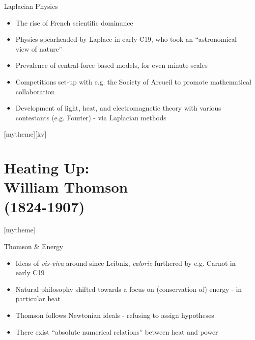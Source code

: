 \documentclass{beamer}
\newcommand{\sectionpic}[2]{
   \setbeamertemplate{section page}[mytheme][#2]
   \section{#1}
   \setbeamertemplate{section page}[mytheme]
}
\begin{document}
\begin{frame}{Laplacian Physics}
\begin{itemize}
	\item The rise of French scientific dominance
	\item Physics spearheaded by Laplace in early C19, who took an ``astronomical view of nature''{ \autocite{merz}}
	\item Prevalence of central-force based models, for even minute scales{ \autocite{foxl}}
	\item Competitions set-up with e.g. the Society of Arcueil to promote mathematical collaboration
	\item Development of light, heat, and electromagnetic theory with various contestants (e.g. Fourier) - via Laplacian methods
\end{itemize}
\end{frame}
  \sectionpic{Heating Up:\\ William Thomson\\\scriptsize{(1824-1907)}}{kv}
\begin{frame}{Thomson \& Energy}
	\begin{itemize}
		\item Ideas of \emph{vis-viva} around since Leibniz, \emph{caloric} furthered by e.g. Carnot in early C19
		\item Natural philosophy shifted towards a focus on (conservation of) energy - in particular heat{ \autocite{newchart}}
		\item Thomson follows Newtonian ideals - refusing to assign hypotheses
		\item There exist ``absolute numerical relations'' between heat and power{\only \autocite{thomdynam}}
	\end{itemize}
\end{frame}
\end{document}
